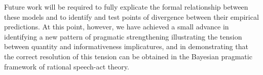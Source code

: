 \documentclass[11pt]{article}
\begin{document}
Future work will be required to fully explicate the formal relationship
between these models and to identify and test points of divergence
between their empirical predictions.  At this point, however, we have
achieved a small advance in identifying a new pattern of pragmatic
strengthening illustrating the tension between quantity and
informativeness implicatures, and in demonstrating that the correct
resolution of this tension can be obtained in the Bayesian pragmatic
framework of rational speech-act theory.




\def\thebibliography#1{\section*{References}
  \small
   \list
   {[\arabic{enumi}]}{\leftmargin \parindent
     \itemindent -\parindent
     \itemsep 0ex plus 1pt
     \parsep 0.1ex plus 1pt minus 1pt
     \usecounter{enumi}}
     \def\newblock{\hskip .11em plus .33em minus .07em}
     \sloppy\clubpenalty4000\widowpenalty4000
     \sfcode`\.=1000\relax}

%

\end{document}
